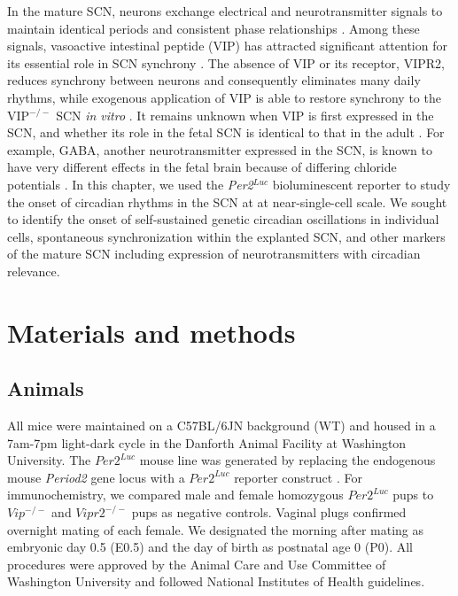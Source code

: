 In the mature SCN, neurons exchange electrical and neurotransmitter signals to maintain identical periods and consistent phase relationships \cite{Mohawk2011, Herzog2015, Evans2016}. 
Among these signals, vasoactive intestinal peptide (VIP) has attracted significant attention for its essential role in SCN synchrony \cite{Aton2005}.
The absence of VIP or its receptor, VIPR2, reduces synchrony between neurons and consequently eliminates many daily rhythms, while exogenous application of VIP is able to restore synchrony to the VIP$^{-/-}$ SCN \textit{in vitro} \cite{Harmar2002, Colwell2003, Aton2005, Maywood2006, Ciarleglio2009}.
It remains unknown when VIP is first expressed in the SCN, and whether its role in the fetal SCN is identical to that in the adult \cite{Wang2014, Ono2016}.
For example, GABA, another neurotransmitter expressed in the SCN, is known to have very different effects in the fetal brain because of differing chloride potentials \cite{fain1999}.
In this chapter, we used the \textit{Per2}$^{Luc}$ bioluminescent reporter to study the onset of circadian rhythms in the SCN at at near-single-cell scale.
We sought to identify the onset of self-sustained genetic circadian oscillations in individual cells, spontaneous synchronization within the explanted SCN, and other markers of the mature SCN including expression of neurotransmitters with circadian relevance.

\section{Materials and methods}

\subsection*{Animals}
All mice were maintained on a C57BL/6JN background (WT) and housed in a 7am-7pm light-dark cycle in the Danforth Animal Facility at Washington University.
The $Per2^{Luc}$ mouse line was generated by replacing the endogenous mouse \textit{Period2} gene locus with a $Per2^{Luc}$ reporter construct \cite{Yoo2004}.
For immunochemistry, we compared male and female homozygous $Per2^{Luc}$ pups to $Vip^{-/-}$ and $Vipr2^{-/-}$ pups as negative controls.
Vaginal plugs confirmed overnight mating of each female.
We designated the morning after mating as embryonic day 0.5 (E0.5) and the day of birth as postnatal age 0 (P0).
All procedures were approved by the Animal Care and Use Committee of Washington University and followed National Institutes of Health guidelines.

